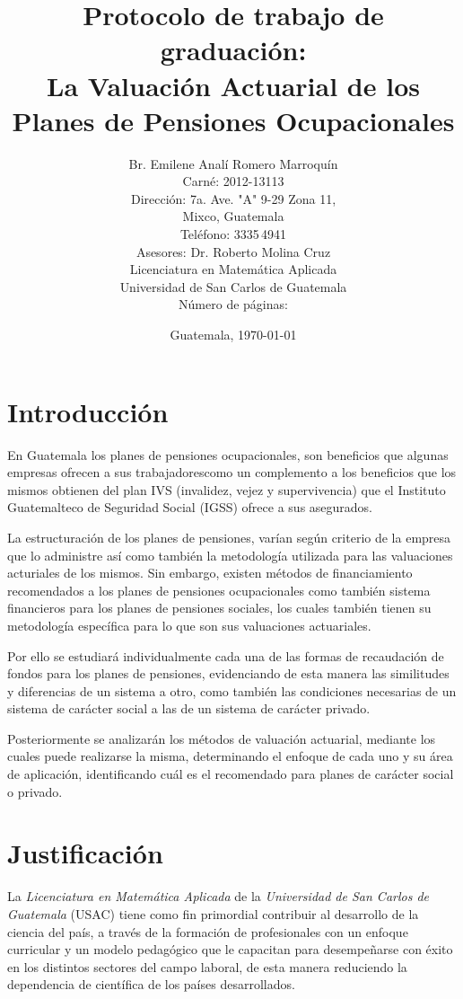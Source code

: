 \documentclass[12pt,letterpaper,titlepage]{article}
\title{Protocolo de trabajo de graduación:\\
La Valuación Actuarial de los Planes de Pensiones Ocupacionales}
\author{Br. Emilene Analí Romero Marroquín\\Carné: 2012-13113\\Dirección: 7a. Ave. "A" 9-29 Zona 11,\\Mixco, Guatemala\\Teléfono: 3335\,4941\\Asesores: Dr. Roberto Molina Cruz\\Licenciatura en Matemática Aplicada\\Universidad de San Carlos de Guatemala\\Número de páginas: \pageref{fin}}
\date{Guatemala, \today}
\begin{document}
\begin{titlepage}
\renewcommand{\thepage}{}
\pagestyle{empty}
\maketitle
\end{titlepage}\newpage
\setcounter{page}{2}
\tableofcontents
\newpage
\nocite{*}
\section{Introducción}

En Guatemala los planes de pensiones ocupacionales, son beneficios que algunas empresas ofrecen a sus trabajadorescomo un complemento a los beneficios que los mismos obtienen del plan IVS (invalidez, vejez y supervivencia) que el Instituto Guatemalteco de Seguridad Social (IGSS) ofrece a sus asegurados. 

La estructuración de los planes de pensiones, varían según criterio de la empresa que lo administre así como también la metodología utilizada para las valuaciones acturiales de los mismos. Sin embargo, existen métodos de financiamiento recomendados a los planes de pensiones ocupacionales como también sistema financieros para los planes de pensiones sociales, los cuales también tienen su metodología específica para lo que son sus valuaciones actuariales.

Por ello se estudiará individualmente cada una de las formas de recaudación de fondos para los planes de pensiones, evidenciando de esta manera las similitudes y diferencias de un sistema a otro, como también las condiciones necesarias de un sistema de carácter social a las de un sistema de carácter privado.

Posteriormente se analizarán los métodos de valuación actuarial, mediante los cuales puede realizarse la misma, determinando el enfoque de cada uno y su área de aplicación, identificando cuál es el recomendado para planes de carácter social o privado.




\newpage

\section{Justificación}

La \textit{Licenciatura en Matemática Aplicada} de la \textit{Universidad de San Carlos de Guatemala} (USAC) tiene como fin primordial contribuir al desarrollo de la ciencia del país, a través de la formación de profesionales con un enfoque curricular y un modelo pedagógico que le capacitan para desempeñarse con éxito en los distintos sectores del campo laboral, de esta manera reduciendo la dependencia de científica de los países desarrollados.\bigskip
\end{document}
